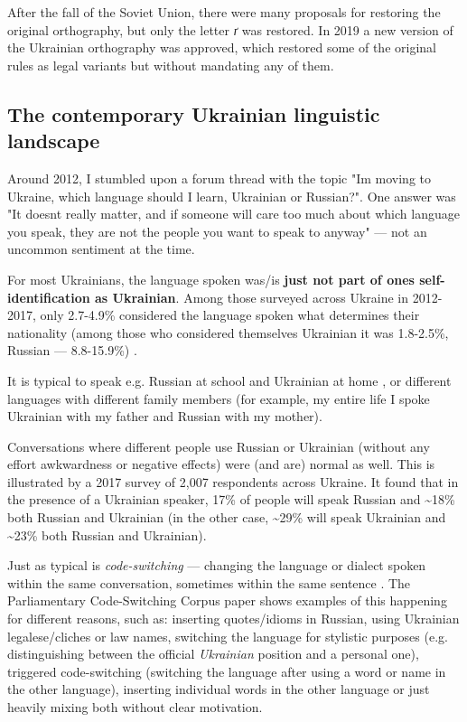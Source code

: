 After the fall of the Soviet Union, there were many proposals for
restoring the original orthography, but only the letter \emph{ґ} was
restored. In 2019 a new version of the Ukrainian orthography was
approved, which restored some of the original rules as
\textquotesingle legal\textquotesingle{} variants but without mandating
any of them.

\subsection{The contemporary Ukrainian linguistic
landscape}\label{the-contemporary-ukrainian-linguistic-landscape}

Around 2012, I stumbled upon a forum thread with the topic
"I\textquotesingle m moving to Ukraine, which language should I learn,
Ukrainian or Russian?". One answer was "It doesn\textquotesingle t
really matter, and if someone will care too much about which language
you speak, they are not the people you want to speak to anyway" --- not
an uncommon sentiment at the time.

For most Ukrainians, the language spoken was/is \textbf{just not part of
one\textquotesingle s self-identification as Ukrainian}. Among those
surveyed across Ukraine in 2012-2017, only 2.7-4.9\% considered the
language spoken what determines their nationality (among those who
considered themselves Ukrainian it was 1.8-2.5\%, Russian ---
8.8-15.9\%) \cite{kulyk2018shedding}.

It is typical to speak e.g. Russian at school and Ukrainian at home
\cite{Racek2024}, or different languages with different family members
(for example, my entire life I spoke Ukrainian with my father and
Russian with my mother).

Conversations where different people use Russian or Ukrainian (without
any effort awkwardness or negative effects) were (and are) normal as
well. This is illustrated by a 2017 survey\cite{Matveyeva2017} of 2,007
respondents across Ukraine. It found that in the presence of a Ukrainian
speaker, 17\% of people will speak Russian and \textasciitilde18\% both
Russian and Ukrainian (in the other case, \textasciitilde29\% will speak
Ukrainian and \textasciitilde23\% both Russian and Ukrainian).

Just as typical is \emph{code-switching} --- changing the language or
dialect spoken within the same conversation, sometimes within the same
sentence \cite{Kanishcheva2023}. The Parliamentary Code-Switching
Corpus paper\cite{Kanishcheva2023} shows examples of this happening for
different reasons, such as: inserting quotes/idioms in Russian, using
Ukrainian legalese/cliches or law names, switching the language for
stylistic purposes (e.g. distinguishing between the official
\emph{Ukrainian} position and a personal one), triggered code-switching
(switching the language after using a word or name in the other
language), inserting individual words in the other language or just
heavily mixing both without clear motivation.

